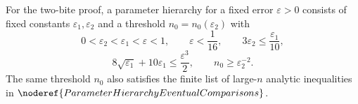 \begin{definition}
For the two-bite proof, a parameter hierarchy for a fixed error
\(\varepsilon>0\) consists of fixed constants
\(\varepsilon_1,\varepsilon_2\) and a threshold \(n_0=n_0(\varepsilon_2)\) with
\[
0<\varepsilon_2<\varepsilon_1<\varepsilon<1,
\qquad
\varepsilon<\frac1{16},
\qquad
3\varepsilon_2\le \frac{\varepsilon_1}{10},
\]
\[
8\sqrt{\varepsilon_1}+10\varepsilon_1\le \frac{\varepsilon^3}{2},
\qquad
n_0\ge \varepsilon_2^{-2}.
\]
The same threshold \(n_0\) also satisfies the finite list of large-\(n\)
analytic inequalities in
\(\noderef{ParameterHierarchyEventualComparisons}\).
\end{definition}

